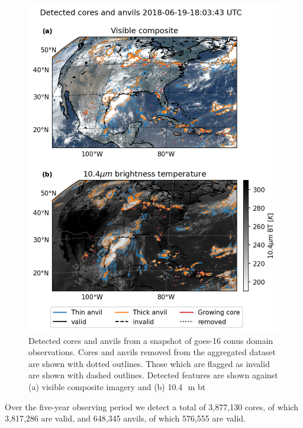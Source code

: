 \begin{figure}[tp]
    \centering
    \includegraphics[width=\textwidth]{figures/ch2_02.png}
    \caption[
    Detected cores and anvils from a snapshot of \acrshort{goes}-16 \acrshort{conus} domain observations
    ]{
    Detected cores and anvils from a snapshot of \acrshort{goes}-16 \acrshort{conus} domain observations. Cores and anvils removed from the aggregated dataset are shown with dotted outlines. Those which are flagged as invalid are shown with dashed outlines. Detected features are shown against (a) visible composite imagery and (b) 10.4\,\unit{\mu m} \acrshort{bt}
    }
    \label{fig:conus_detected_dccs}
\end{figure}

Over the five-year observing period we detect a total of 3,877,130 cores, of which 3,817,286 are valid, and 648,345 anvils, of which 576,555 are valid.




